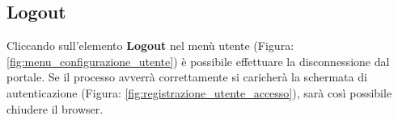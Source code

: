 	\subsection{Logout} %
	\label{sec:logout}
		Cliccando sull'elemento \textbf{Logout} nel menù utente (Figura: \ref{fig:menu_configurazione_utente}) è possibile effettuare la disconnessione dal portale.\newline
		Se il processo avverrà correttamente si caricherà la schermata di autenticazione (Figura: \ref{fig:registrazione_utente_accesso}), sarà così possibile chiudere il browser.		


